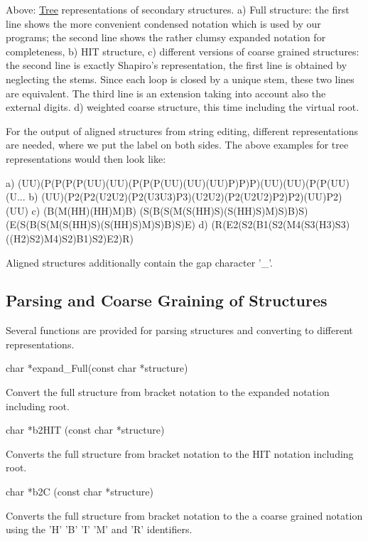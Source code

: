 Above\-: \hyperlink{structTree}{Tree} representations of secondary structures. a) Full structure\-: the first line shows the more convenient condensed notation which is used by our programs; the second line shows the rather clumsy expanded notation for completeness, b) H\-I\-T structure, c) different versions of coarse grained structures\-: the second line is exactly Shapiro's representation, the first line is obtained by neglecting the stems. Since each loop is closed by a unique stem, these two lines are equivalent. The third line is an extension taking into account also the external digits. d) weighted coarse structure, this time including the virtual root.

For the output of aligned structures from string editing, different representations are needed, where we put the label on both sides. The above examples for tree representations would then look like\-:

\begin{DoxyVerb}a) (UU)(P(P(P(P(UU)(UU)(P(P(P(UU)(UU)(UU)P)P)P)(UU)(UU)(P(P(UU)(U...
b) (UU)(P2(P2(U2U2)(P2(U3U3)P3)(U2U2)(P2(U2U2)P2)P2)(UU)P2)(UU)
c) (B(M(HH)(HH)M)B)
   (S(B(S(M(S(HH)S)(S(HH)S)M)S)B)S)
   (E(S(B(S(M(S(HH)S)(S(HH)S)M)S)B)S)E)
d) (R(E2(S2(B1(S2(M4(S3(H3)S3)((H2)S2)M4)S2)B1)S2)E2)R)
\end{DoxyVerb}


Aligned structures additionally contain the gap character '\-\_\-'.

\subsection*{Parsing and Coarse Graining of Structures}

Several functions are provided for parsing structures and converting to different representations.

\begin{DoxyVerb}char  *expand_Full(const char *structure)
\end{DoxyVerb}
 Convert the full structure from bracket notation to the expanded notation including root.

\begin{DoxyVerb}char *b2HIT (const char *structure)
\end{DoxyVerb}
 Converts the full structure from bracket notation to the H\-I\-T notation including root.

\begin{DoxyVerb}char *b2C (const char *structure)
\end{DoxyVerb}
 Converts the full structure from bracket notation to the a coarse grained notation using the 'H' 'B' 'I' 'M' and 'R' identifiers.

